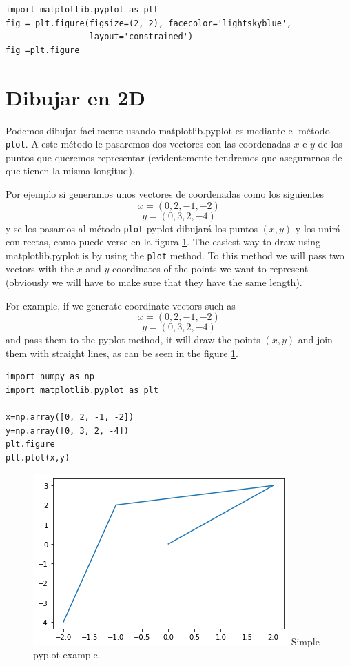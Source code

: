 \begin{paracol}{2}

\end{paracol}
\begin{verbatim}
import matplotlib.pyplot as plt
fig = plt.figure(figsize=(2, 2), facecolor='lightskyblue',
                 layout='constrained')
fig =plt.figure            
\end{verbatim}

\section{Dibujar en 2D}
\begin{paracol}{2}
    Podemos dibujar facilmente usando matplotlib.pyplot es mediante el método \texttt{plot}. A este método le pasaremos dos vectores con las coordenadas $x$ e $y$ de los puntos que queremos representar (evidentemente tendremos que asegurarnos de que tienen la misma longitud).

    Por ejemplo si generamos unos vectores de coordenadas como los siguientes 
    $$x=(0,2,-1,-2)$$ 
    $$y=(0,3,2,-4)$$
    y se los pasamos al método \texttt{plot} pyplot dibujará los puntos $(x,y)$ y los unirá con rectas, como puede verse en la figura \ref{fig:pyplot-simple}.
    \switchcolumn
        The easiest way to draw using matplotlib.pyplot is by using the \texttt{plot} method. To this method we will pass two vectors with the $x$ and $y$ coordinates of the points we want to represent (obviously we will have to make sure that they have the same length).  

            For example, if we generate coordinate vectors such as 
            $$x=(0,2,-1,-2)$$ 
            $$y=(0,3,2,-4)$$ 
            and pass them to the pyplot method, it will draw the points $(x,y)$ and join them with straight lines, as can be seen in the figure \ref{fig:pyplot-simple}.
        
\end{paracol}
\begin{verbatim}
import numpy as np
import matplotlib.pyplot as plt

x=np.array([0, 2, -1, -2])
y=np.array([0, 3, 2, -4])
plt.figure
plt.plot(x,y)
\end{verbatim}
\begin{figure}[h]
    \centering
    \includegraphics[width=0.5\linewidth]{figuras/pyplot01.png}
     {Simple pyplot example.}
    \label{fig:pyplot-simple}
\end{figure}


